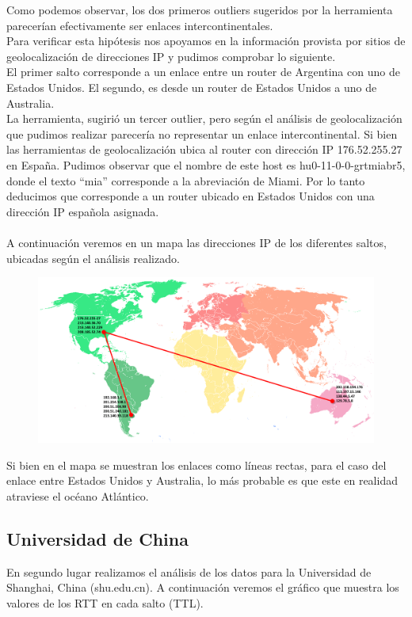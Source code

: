 Como podemos observar, los dos primeros outliers sugeridos por la herramienta parecerían efectivamente ser enlaces intercontinentales.
\\
Para verificar esta hipótesis nos apoyamos en la información provista por sitios de geolocalización de direcciones IP y pudimos comprobar lo siguiente.
\\
El primer salto corresponde a un enlace entre un router de Argentina con uno de Estados Unidos. El segundo, es desde un router de Estados Unidos a uno de Australia.
\\
La herramienta, sugirió un tercer outlier, pero según el análisis de geolocalización que pudimos realizar parecería no representar un enlace intercontinental. Si bien las herramientas de geolocalización ubica al router con dirección IP 176.52.255.27 en España. Pudimos observar que el nombre de este host es hu0-11-0-0-grtmiabr5, donde el texto “mia” corresponde a la abreviación de Miami. Por lo tanto deducimos que corresponde a un router ubicado en Estados Unidos con una dirección IP española asignada. 
\\\\
A continuación veremos en un mapa las direcciones IP de los diferentes saltos, ubicadas según el análisis realizado.

\FloatBarrier

\begin{figure}[ht!]
  \centering
   \includegraphics[width=1.0\textwidth]{imagenes/mapaAUS.png}
\end{figure}

\FloatBarrier

Si bien en el mapa se muestran los enlaces como líneas rectas, para el caso del enlace entre Estados Unidos y Australia, lo más probable es que este en realidad atraviese el océano Atlántico.

\subsection{Universidad de China}
En segundo lugar realizamos el análisis de los datos para la Universidad de Shanghai, China (shu.edu.cn). 
A continuación veremos el gráfico que muestra los valores de los RTT en cada salto (TTL).

